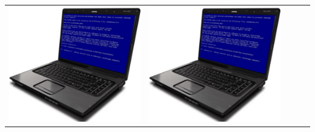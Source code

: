 \begin{frame}
\begin{description}[short]
\item[Severity:] \enskip\\
  \enskip\\
  \begin{tabular}{ccccc}
    \includegraphics[scale=0.025]{input/content/figures/blue_screen.pdf} &
    \includegraphics[scale=0.025]{input/content/figures/blue_screen.pdf} &

\end{tabular}
\end{description}
\end{frame}
